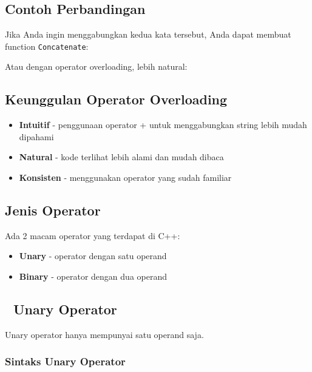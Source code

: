 \subsection{Contoh Perbandingan}



Jika Anda ingin menggabungkan kedua kata tersebut, Anda dapat membuat function \texttt{Concatenate}:



Atau dengan operator overloading, lebih natural:



\subsection{Keunggulan Operator Overloading}

\begin{itemize}
\item \textbf{Intuitif} - penggunaan operator + untuk menggabungkan string lebih mudah dipahami
\item \textbf{Natural} - kode terlihat lebih alami dan mudah dibaca
\item \textbf{Konsisten} - menggunakan operator yang sudah familiar
\end{itemize}

\subsection{Jenis Operator}

Ada 2 macam operator yang terdapat di C++:
\begin{itemize}
\item \textbf{Unary} - operator dengan satu operand
\item \textbf{Binary} - operator dengan dua operand
\end{itemize}

\subsection{🔢 Unary Operator}\label{unary-operator}

Unary operator hanya mempunyai satu operand saja.

\subsubsection{Sintaks Unary Operator}


